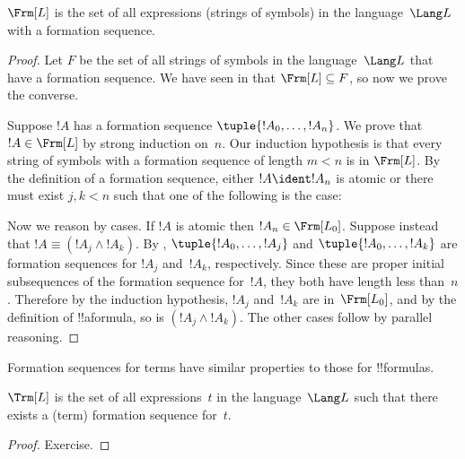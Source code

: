 \documentclass[../../../include/open-logic-section]{subfiles}
\begin{document}
\begin{thm}
$\Frm[L]$ is the set of all expressions (strings of symbols)
in the language~$\Lang L$ with a formation sequence.
\end{thm}

\begin{proof}
Let $F$ be the set of all strings of symbols in the language~$\Lang L$
that have a formation sequence. We have seen in
 that $\Frm[L] \subseteq F$, so now
we prove the converse.

Suppose $!A$ has a formation sequence $\tuple{!A_0,\dotsc,!A_n}$.
We prove that $!A \in \Frm[L]$ by strong induction on~$n$.
Our induction hypothesis is that every string of symbols with a
formation sequence of length $m < n$ is in $\Frm[L]$.
By the definition of a formation sequence, either $!A \ident !A_n$ is
atomic or there must exist $j,k < n$ such that one of the
following is the case:
\begin{enumerate}
\end{enumerate}
Now we reason by cases. If $!A$ is atomic then
$!A_n \in \Frm[L_0]$. Suppose instead that
$!A \equiv (!A_j \land !A_k)$. By 
,
$\tuple{!A_0,\dotsc,!A_j}$ and $\tuple{!A_0,\dotsc,!A_k}$ are
formation sequences for $!A_j$ and~$!A_k$, respectively. Since
these are proper initial subsequences of the formation sequence
for~$!A$, they both have length less than~$n$. Therefore by
the induction hypothesis, $!A_j$ and~$!A_k$ are in~$\Frm[L_0]$,
and by the definition of !!a{formula}, so is
$(!A_j \land !A_k)$. The other cases follow by parallel
reasoning.
\end{proof}

Formation sequences for terms have similar properties to those
for !!{formula}s.

\begin{prop}
$\Trm[L]$ is the set of all expressions~$t$ in the language~$\Lang L$
such that there exists a (term) formation sequence for~$t$.
\end{prop}

\begin{proof}
Exercise.
\end{proof}
\end{document}
